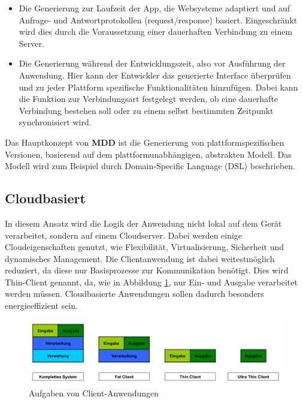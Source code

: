 \begin{itemize}
	\item Die Generierung zur Laufzeit der App, die Websysteme adaptiert und auf Anfrage- und Antwortprotokollen (request/response) basiert. Eingeschränkt wird dies durch die Voraussetzung einer dauerhaften Verbindung zu einem Server.
	
	\item Die Generierung während der Entwicklungszeit, also vor Ausführung der Anwendung. Hier kann der Entwickler das generierte Interface überprüfen und zu jeder Plattform spezifische Funktionalitäten hinzufügen. Dabei kann die Funktion zur Verbindungsart festgelegt werden, ob eine dauerhafte Verbindung bestehen soll oder zu einem selbst bestimmten Zeitpunkt synchronisiert wird.
\end{itemize}

\bigskip
Das Hauptkonzept von \textbf{MDD} ist die Generierung von plattformspezifischen Versionen, basierend auf dem plattformunabhängigen, abstrakten Modell. Das Modell wird zum Beispiel durch Domain-Specific Language (DSL) beschrieben.

\subsection{Cloudbasiert}
In diesem Ansatz wird die Logik der Anwendung nicht lokal auf dem Gerät verarbeitet, sondern auf einem Cloudserver. Dabei werden einige Cloudeigenschaften genutzt, wie Flexibilität, Virtualisierung, Sicherheit und dynamisches Management. Die Clientanwendung ist dabei weitestmöglich reduziert, da diese nur Basisprozesse zur Kommunikation benötigt. Dies wird Thin-Client genannt, da, wie in Abbildung \ref{client_aufgaben}, nur Ein- und Ausgabe verarbeitet werden müssen. Cloudbasierte Anwendungen sollen dadurch besonders energieeffizient sein.

\begin{figure}[htbp]
	\centering
	\includegraphics[width=1\textwidth]{Bilder/Aufgaben_Endgeraet}
	\caption{Aufgaben von Client-Anwendungen}\label{client_aufgaben}
\end{figure}


